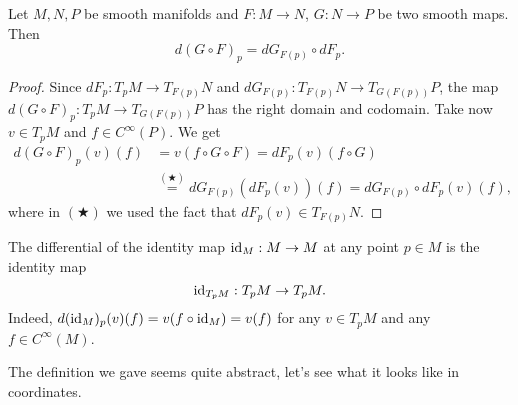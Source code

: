 \begin{theorem}\label{thm:chainrule_mfld}
  Let $M, N, P$ be smooth manifolds and $F: M \to N$, $G: N\to P$ be two smooth maps. Then
  \begin{equation}
    d(G\circ F)_p = dG_{F(p)} \circ dF_p.
  \end{equation}
\end{theorem}
\begin{proof}
  Since $dF_p : T_p M \to T_{F(p)}N$ and $dG_{F(p)}: T_{F(p)}N \to T_{G(F(p))}P$, the map $d(G\circ F)_p: T_p M \to T_{G(F(p))}P$ has the right domain and codomain.
  Take now $v\in T_p M$ and $f\in C^\infty(P)$. We get
  \begin{align}
    d(G\circ F)_p(v)(f) & = v(f\circ G \circ F)
    = dF_p (v)(f\circ G)                                                  \\
                        & \stackrel{(\bigstar)}{=} dG_{F(p)}(dF_p (v))(f)
    = dG_{F(p)} \circ dF_p (v)(f),
  \end{align}
  where in $(\bigstar)$ we used the fact that $dF_p (v)\in T_{F(p)}N$.
\end{proof}

\begin{remark}
  The differential of the identity map $\operatorname{id}_M:M\to M$ at any point $p\in M$ is the identity map
  \begin{equation}
    \operatorname{id}_{T_pM}: T_pM \to T_pM.
  \end{equation}
  Indeed, $d (\operatorname{id}_M)_p(v)(f) = v(f\circ\operatorname{id}_M) = v(f)$ for any $v\in T_pM$ and any $f\in C^\infty(M)$.
\end{remark}

The definition we gave seems quite abstract, let's see what it looks like in coordinates.

